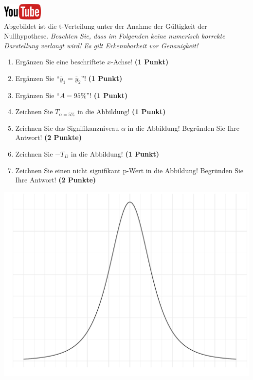 \documentclass[a4paper, 9pt]{scrartcl}\usepackage[]{graphicx}\usepackage[]{xcolor}
\makeatletter
\def\maxwidth{ %
  \ifdim\Gin@nat@width>\linewidth
    \linewidth
  \else
    \Gin@nat@width
  \fi
}
\makeatother
\begin{document}
\hfill\href{https://youtu.be/32JjH1eyuTU}{\includegraphics[width =
  2cm]{img/youtube}}\\[1Ex]



Abgebildet ist die t-Verteilung unter der Anahme der G{\"u}ltigkeit der
Nullhypothese. \textit{Beachten Sie, dass im Folgenden keine
  numerisch korrekte Darstellung verlangt wird! Es gilt Erkennbarkeit vor
  Genauigkeit!}

\begin{enumerate}
\item Erg{\"a}nzen Sie eine beschriftete $x$-Achse! \textbf{(1 Punkt)}
\item Erg{\"a}nzen Sie "`$\bar{y}_1 = \bar{y}_2$"'! \textbf{(1 Punkt)} 
\item Erg{\"a}nzen Sie "`$A = 95\%$"'! \textbf{(1 Punkt)}
\item Zeichnen Sie $T_{\alpha=5\%}$ in die Abbildung! \textbf{(1 Punkt)} 
\item Zeichnen Sie das Signifikanzniveau $\alpha$ in die Abbildung! Begr{\"u}nden
  Sie Ihre Antwort! \textbf{(2 Punkte)} 
\item Zeichnen Sie $-T_{D}$ in die Abbildung! \textbf{(1
    Punkt)}
\item Zeichnen Sie einen nicht signifikant p-Wert in die Abbildung! Begr{\"u}nden
  Sie Ihre Antwort! \textbf{(2 Punkte)}   
\end{enumerate}



{\centering \includegraphics[width=\maxwidth]{img/statistisches-testen-3-1} 

}
\end{document}

